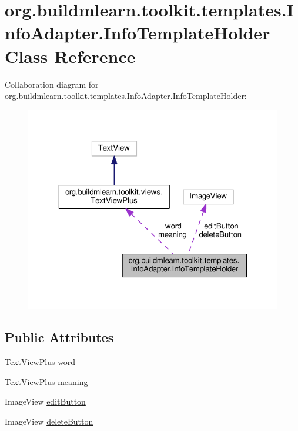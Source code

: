 \hypertarget{classorg_1_1buildmlearn_1_1toolkit_1_1templates_1_1InfoAdapter_1_1InfoTemplateHolder}{}\section{org.\+buildmlearn.\+toolkit.\+templates.\+Info\+Adapter.\+Info\+Template\+Holder Class Reference}
\label{classorg_1_1buildmlearn_1_1toolkit_1_1templates_1_1InfoAdapter_1_1InfoTemplateHolder}


Collaboration diagram for org.\+buildmlearn.\+toolkit.\+templates.\+Info\+Adapter.\+Info\+Template\+Holder\+:
\nopagebreak
\begin{figure}[H]
\begin{center}
\leavevmode
\includegraphics[width=323pt]{classorg_1_1buildmlearn_1_1toolkit_1_1templates_1_1InfoAdapter_1_1InfoTemplateHolder__coll__graph}
\end{center}
\end{figure}
\subsection*{Public Attributes}
\begin{DoxyCompactItemize}
\item 
\hyperlink{classorg_1_1buildmlearn_1_1toolkit_1_1views_1_1TextViewPlus}{Text\+View\+Plus} \hyperlink{classorg_1_1buildmlearn_1_1toolkit_1_1templates_1_1InfoAdapter_1_1InfoTemplateHolder_a0391d141913c5ab231c1b22cc0c32a55}{word}
\item 
\hyperlink{classorg_1_1buildmlearn_1_1toolkit_1_1views_1_1TextViewPlus}{Text\+View\+Plus} \hyperlink{classorg_1_1buildmlearn_1_1toolkit_1_1templates_1_1InfoAdapter_1_1InfoTemplateHolder_a50883106775afa0b300bfad56a609dc0}{meaning}
\item 
Image\+View \hyperlink{classorg_1_1buildmlearn_1_1toolkit_1_1templates_1_1InfoAdapter_1_1InfoTemplateHolder_acdfcdf656cddda764d19e3c813b40553}{edit\+Button}
\item 
Image\+View \hyperlink{classorg_1_1buildmlearn_1_1toolkit_1_1templates_1_1InfoAdapter_1_1InfoTemplateHolder_a89300faff2511b44e9667d3e84ae371b}{delete\+Button}
\end{DoxyCompactItemize}


